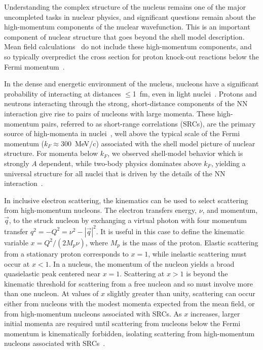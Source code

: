 
Understanding the complex structure of the nucleus remains one of the major uncompleted tasks in nuclear
physics, and significant questions remain about the high-momentum components of the nuclear wavefunction.
This is an important component of nuclear structure that goes beyond the shell model description. Mean field
calculations~\cite{DeForest1983} do not include these high-momentum components, and so typically overpredict
the cross section for proton knock-out reactions below the Fermi momentum~\cite{VanDerSteenhoven1988547,
Lapikas1993297, Kelly:1996hd}.


In the dense and energetic environment of the nucleus, nucleons have a significant probability of
interacting at distances $\le$1~fm, even in light nuclei~\cite{carlson14,lu13}. Protons and neutrons
interacting through the strong, short-distance components of the NN interaction give rise to pairs of
nucleons with large momenta. These high-momentum pairs, referred to as short-range correlations (SRCs), are
the primary source of high-momenta in nuclei~\cite{Frankfurt1981215, SLAC_Measurement_PRC.48.2451,
src_john}, well above the typical scale of the Fermi momentum ($k_F \approx 300$~MeV/c) associated with the
shell model picture of nuclear structure. For momenta below $k_F$, we observed shell-model behavior which is
strongly $A$ dependent, while two-body physics dominates above $k_F$, yielding a universal
structure for all nuclei that is driven by the details of the NN interaction~\cite{RevModPhys.80.189,
PhysRevC.53.1689, wiringa14}.

In inclusive electron scattering, the kinematics can be used to select scattering from high-momentum
nucleons. The electron transfers energy, $\nu$, and momentum, $\vec{q}$, to the struck nucleon by exchanging
a virtual photon with four momentum transfer $q^2 = - Q^{2} = \nu^{2}-|\vec{q}|^{2}$. It is useful in this
case to define the kinematic variable $x = Q^2/(2M_p\nu)$, where $M_p$ is the mass of the proton. Elastic
scattering from a stationary proton corresponds to $x=1$, while inelastic scattering must occur at $x<1$. In
a nucleus, the momentum of the nucleon yields a broad quasielastic peak centered near $x=1$. Scattering at
$x>1$ is beyond the kinematic threshold for scattering from a free nucleon and so must involve more than one
nucleon. At values of $x$ slightly greater than unity, scattering can occur either from nucleons with the
modest momenta expected from the mean field, or from high-momentum nucleons associated with SRCs. As $x$
increases, larger initial momenta are required until scattering from nucleons below the Fermi
momentum is kinematically forbidden, isolating scattering from high-momentum nucleons associated with
SRCs~\cite{RevModPhys.80.189, PhysRevC.53.1689, src_john, egiyan2003}.

